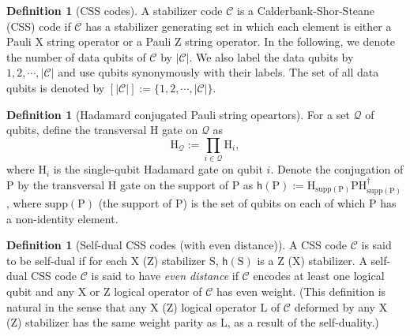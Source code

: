 \documentclass[reprint,aps,twocolumn,superscriptaddress,showpacs,notitlepage,10pt]{revtex4-2}
\theoremstyle{definition}
\newtheorem{definition}[theorem]{Definition}
\begin{document}
\begin{definition}[CSS codes]\label{def: css codes}
    A stabilizer code $\mathcal{C}$ is a Calderbank-Shor-Steane (CSS) code if $\mathcal{C}$ has a stabilizer generating set in which each element is either a Pauli $\mathrm{X}$ string operator or a Pauli $\mathrm{Z}$ string operator. In the following, we denote the number of data qubits of $\mathcal{C}$ by $|\mathcal{C}|$. We also label the data qubits by $1, 2, \cdots, |\mathcal{C}|$ and use qubits synonymously with their labels. The set of all data qubits is denoted by $[|\mathcal{C}|]:=\{1,2,\cdots,|\mathcal{C}|\}$.  
\end{definition}
\begin{definition}[Hadamard conjugated Pauli string opeartors]\label{def: hadamard conjugation}
For a set $\mathcal{Q}$ of qubits, define the transversal $\mathrm{H}$ gate on $\mathcal{Q}$ as \[
\mathrm{H}_{\mathcal{Q}} := \prod_{i\in\mathcal{Q}}\mathrm{H}_{i},
\] where $\mathrm{H}_i$ is the single-qubit Hadamard gate on qubit $i$. Denote the conjugation of $\mathrm{P}$ by the transversal $\mathrm{H}$ gate on the support of $\mathrm{P}$ as $\mathsf{h}(\mathrm{P}):=\mathrm{H}_{\mathrm{supp}(\mathrm{P})}\mathrm{P}\mathrm{H}_{\mathrm{supp}(\mathrm{P})}^{\dagger}$, where $\mathrm{supp}(\mathrm{P})$ (the support of $\mathrm{P}$) is the set of qubits on each of which $\mathrm{P}$ has a non-identity element. 
\end{definition}
\begin{definition}[Self-dual CSS codes (with even distance)] \label{def: self dual css codes}
    A CSS code $\mathcal{C}$ is said to be self-dual if for each $\mathrm{X}$ ($\mathrm{Z}$) stabilizer $\mathrm{S}$, $\mathsf{h}(\mathrm{S})$ is a $\mathrm{Z}$ ($\mathrm{X}$) stabilizer. A self-dual CSS code $\mathcal{C}$ is said to have \textit{even distance} if $\mathcal{C}$ encodes at least one logical qubit and any X or Z logical operator of $\mathcal{C}$ has even weight. (This definition is natural in the sense that any X (Z) logical operator $\mathrm{L}$ of $\mathcal{C}$ deformed by any X (Z) stabilizer has the same weight parity as $\mathrm{L}$, as a result of the self-duality.) 
\end{definition}
\end{document}
